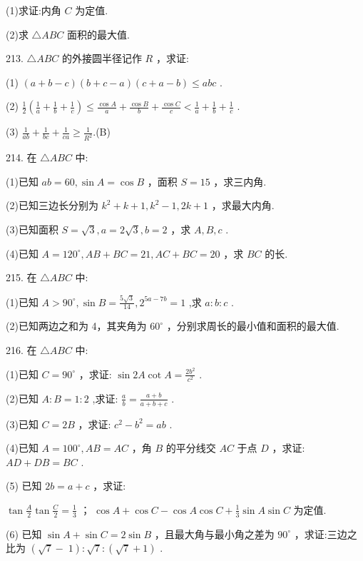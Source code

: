 \documentclass[10pt]{article}
\newcommand*\circled[1]{\tikz[baseline=(char.base)]{\node[shape=circle,draw,inner sep=1.5pt] (char) {\small #1};}}
\begin{document}
(1)求证:内角 \(C\) 为定值.

(2)求 \(\bigtriangleup  {ABC}\) 面积的最大值.

213. \(\bigtriangleup {ABC}\) 的外接圆半径记作 \(R\) ，求证:

(1) \(\left( {a + b - c}\right) \left( {b + c - a}\right) \left( {c + a - b}\right)  \leq  {abc}\) .

(2) \(\frac{1}{2}\left( {\frac{1}{a} + \frac{1}{b} + \frac{1}{c}}\right)  \leq  \frac{\cos A}{a} + \frac{\cos B}{b} + \frac{\cos C}{c} < \frac{1}{a} + \frac{1}{b} + \frac{1}{c}\) .

(3) \(\frac{1}{ab} + \frac{1}{bc} + \frac{1}{ca} \geq  \frac{1}{{R}^{2}}.\)(B)

214. 在 \(\bigtriangleup  {ABC}\) 中:

(1)已知 \({ab} = {60},\sin A = \cos B\) ，面积 \(S = {15}\) ，求三内角.

(2)已知三边长分别为 \({k}^{2} + k + 1,{k}^{2} - 1,{2k} + 1\) ，求最大内角.

(3)已知面积 \(S = \sqrt{3},a = 2\sqrt{3},b = 2\) ，求 \(A,B,c\) .

(4)已知 \(A = {120}^{ \circ  },{AB} + {BC} = {21},{AC} + {BC} = {20}\) ，求 \({BC}\) 的长.

215. 在 \(\bigtriangleup  {ABC}\) 中:

(1)已知 \(A > {90}^{ \circ  },\sin B = \frac{5\sqrt{3}}{14},{2}^{{5a} - {7b}} = 1\) ,求 \(a : b : c\) .

(2)已知两边之和为 4，其夹角为 \({60}^{ \circ  }\) ，分别求周长的最小值和面积的最大值.

216. 在 \(\bigtriangleup  {ABC}\) 中:

(1)已知 \(C = {90}^{ \circ  }\) ，求证: \(\sin {2A}\cot A = \frac{2{b}^{2}}{{c}^{2}}\) .

(2)已知 \(A : B = 1 : 2\) ,求证: \(\frac{a}{b} = \frac{a + b}{a + b + c}\) .

(3)已知 \(C = {2B}\) ，求证: \({c}^{2} - {b}^{2} = {ab}\) .

(4)已知 \(A = {100}^{ \circ  },{AB} = {AC}\) ，角 \(B\) 的平分线交 \({AC}\) 于点 \(D\) ，求证: \({AD} + {DB} = {BC}\) .

(5) 已知 \({2b} = a + c\) ，求证:

 \circled{1}  \(\tan \frac{A}{2}\tan \frac{C}{2} = \frac{1}{3}\) ；  \circled{2}  \(\cos A + \cos C - \cos A\cos C + \frac{1}{3}\sin A\sin C\) 为定值.

(6) 已知 \(\sin A + \sin C = 2\sin B\) ，且最大角与最小角之差为 \({90}^{ \circ  }\) ，求证:三边之比为 \((\sqrt{7} - \; 1) : \sqrt{7} : \left( {\sqrt{7} + 1}\right)\) .
\end{document}

